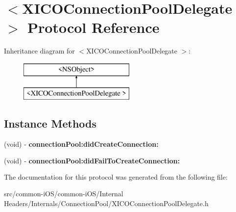 \hypertarget{protocol_x_i_c_o_connection_pool_delegate_01-p}{}\section{$<$X\+I\+C\+O\+Connection\+Pool\+Delegate $>$ Protocol Reference}
\label{protocol_x_i_c_o_connection_pool_delegate_01-p}
Inheritance diagram for $<$X\+I\+C\+O\+Connection\+Pool\+Delegate $>$\+:\begin{figure}[H]
\begin{center}
\leavevmode
\includegraphics[height=2.000000cm]{protocol_x_i_c_o_connection_pool_delegate_01-p}
\end{center}
\end{figure}
\subsection*{Instance Methods}
\begin{DoxyCompactItemize}
\item 
\hypertarget{protocol_x_i_c_o_connection_pool_delegate_01-p_a242e32a341429de838dc527ba721ef93}{}\label{protocol_x_i_c_o_connection_pool_delegate_01-p_a242e32a341429de838dc527ba721ef93} 
(void) -\/ {\bfseries connection\+Pool\+:did\+Create\+Connection\+:}
\item 
\hypertarget{protocol_x_i_c_o_connection_pool_delegate_01-p_a3d577b5f3a5fe028fee40ab4ee4a77ad}{}\label{protocol_x_i_c_o_connection_pool_delegate_01-p_a3d577b5f3a5fe028fee40ab4ee4a77ad} 
(void) -\/ {\bfseries connection\+Pool\+:did\+Fail\+To\+Create\+Connection\+:}
\end{DoxyCompactItemize}


The documentation for this protocol was generated from the following file\+:\begin{DoxyCompactItemize}
\item 
src/common-\/i\+O\+S/common-\/i\+O\+S/\+Internal Headers/\+Internals/\+Connection\+Pool/X\+I\+C\+O\+Connection\+Pool\+Delegate.\+h\end{DoxyCompactItemize}
